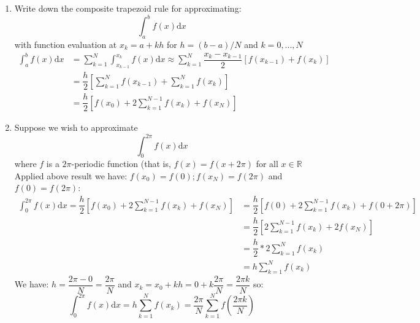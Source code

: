 \documentclass[14pt,a4paper]{article}
\begin{document}
\begin{enumerate}
	\label{2a} 
	\item Write down the composite trapezoid rule for approximating:
	$$ \int_{a}^{b} f(x)\mathrm{d}x $$
	with function evaluation at $x_k = a + kh$ for $ h = (b-a)/N$ and $ k = 0, ..., N$
	\begin{align*} \int_{a}^{b} f(x)\mathrm{d}x  &= \sum_{k=1}^{N}\int_{x_{k-1}}^{x_k} f(x)\mathrm{d}x \approx \sum_{k=1}^{N} \dfrac{x_k - x_{k-1}}{2} [f(x_{k-1}) + f(x_k)] \\
	&= \dfrac{h}{2} \left[ \sum_{k=1}^{N}f(x_{k-1}) + \sum_{k=1}^{N} f(x_k) \right] \\
	&= \dfrac{h}{2} \left[ f(x_0) + 2\sum_{k=1}^{N-1}f(x_k) + f(x_N) \right] \end{align*}
		
	\label{2b}	
	\item Suppose we wish to approximate
	$$ \int_{0}^{2\pi} f(x)\mathrm{d}x$$
	where $f$ is a $2\pi$-periodic function (that is, $f(x) = f(x + 2\pi)$ for all $x \in \mathbb{R}$ \\
	Applied above result we have: $f(x_0) = f(0); f(x_N) = f(2\pi)$ and $f(0) = f(2\pi)$:
	\begin{align*} \int_{0}^{2\pi} f(x)\mathrm{d}x  = \dfrac{h}{2} \left[ f(x_0) + 2\sum_{k=1}^{N-1}f(x_k) + f(x_N) \right]  &= \dfrac{h}{2} \left[ f(0) + 2\sum_{k=1}^{N-1}f(x_k) + f(0 + 2\pi) \right] \\
	&= \dfrac{h}{2} \left[ 2\sum_{k=1}^{N-1}f(x_k) + 2f(x_N) \right]\\ &= \dfrac{h}{2}* 2\sum_{k=1}^{N}f(x_k) \\ &= h\sum_{k=1}^{N}f(x_k)\end{align*}
	We have: $h = \dfrac{2\pi - 0}{N} = \dfrac{2\pi}{N}$ and $x_k = x_0 + kh = 0 + k\dfrac{2\pi}{N} = \dfrac{2\pi k}{N}$ so:
	$$ \int_{0}^{2\pi} f(x)\mathrm{d}x  = h\sum_{k=1}^{N}f(x_k) = \dfrac{2\pi}{N} \sum_{k=1}^{N} f\left(\dfrac{2\pi k}{N}\right) $$
	

\end{enumerate}
\end{document}
